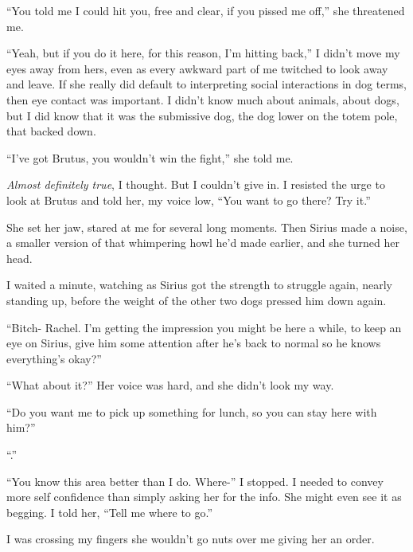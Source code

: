 ``You told me I could hit you, free and clear, if you pissed me off,'' she threatened me.



``Yeah, but if you do it here, for this reason, I'm hitting back,'' I didn't move my eyes away from hers, even as every awkward part of me twitched to look away and leave.  If she really did default to interpreting social interactions in dog terms, then eye contact was important.  I didn't know much about animals, about dogs, but I did know that it was the submissive dog, the dog lower on the totem pole, that backed down.



``I've got Brutus, you wouldn't win the fight,'' she told me.



\emph{Almost definitely true}, I thought.  But I couldn't give in.  I resisted the urge to look at Brutus and told her, my voice low, ``You want to go there?  Try it.''



She set her jaw, stared at me for several long moments.  Then Sirius made a noise, a smaller version of that whimpering howl he'd made earlier, and she turned her head.



I waited a minute, watching as Sirius got the strength to struggle again, nearly standing up, before the weight of the other two dogs pressed him down again.



``Bitch- Rachel.  I'm getting the impression you might be here a while, to keep an eye on Sirius, give him some attention after he's back to normal so he knows everything's okay?''



``What about it?''  Her voice was hard, and she didn't look my way.



``Do you want me to pick up something for lunch, so you can stay here with him?''



``\ldotsFine.''



``You know this area better than I do.  Where-'' I stopped.  I needed to convey more self confidence than simply asking her for the info.  She might even see it as begging.  I told her, ``Tell me where to go.''



I was crossing my fingers she wouldn't go nuts over me giving her an order.



